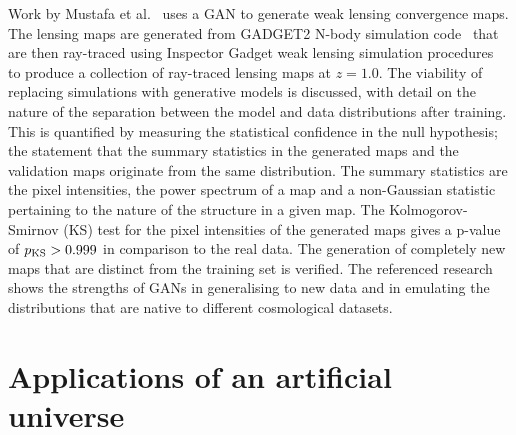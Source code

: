 \documentclass[twocolumn]{article}
\numberwithin{equation}{section}
\begin{document}
Work by Mustafa et al.~\cite{cosmogan} uses a GAN to generate weak lensing convergence maps. The lensing maps are 
generated from GADGET2 N-body simulation code~\cite{gadget2} that are then ray-traced using Inspector Gadget weak 
lensing simulation procedures~\cite{mink_funcs, lens_peaks, lens_peak_counts} to produce a collection of ray-traced 
lensing maps at $z=1.0$. The viability of replacing simulations with generative models is discussed, with detail on 
the nature of the separation between the model and data distributions after training. This is quantified by measuring 
the statistical confidence in the null hypothesis; the statement that the summary statistics in the generated maps and 
the validation maps originate from the same distribution. The summary statistics are the pixel intensities, the power 
spectrum of a map and a non-Gaussian statistic pertaining to the nature of the structure in a given map. The 
Kolmogorov-Smirnov (KS) test for the pixel intensities of the generated maps gives a p-value of $p_{\textup{KS}} > 
0.999$ in comparison to the real data. The generation of completely new maps that are distinct from the training set
is verified. The referenced research shows the strengths of GANs in generalising to new data and in emulating the 
distributions that are native to different cosmological datasets.


\section{Applications of an artificial universe}\label{sec:universe_applications}

\end{document}
